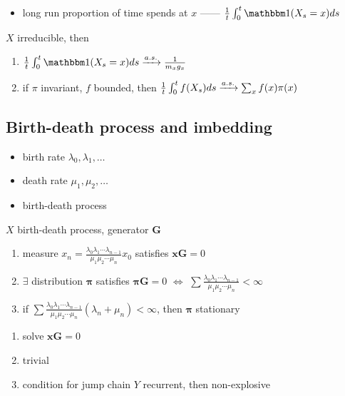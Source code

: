 \begin{itemize}
    \item long run proportion of time spends at $x$ ------ $\frac{1}{t} \int_0^t \In(X_s = x)ds$
\end{itemize}

\begin{thm}
    $X$ irreducible, then
    \begin{enumerate}
        \item $\frac{1}{t} \int_0^t \In(X_s = x)ds \rightarrowas \frac{1}{m_x g_x} $
        \item if $\pi$ invariant, $f$ bounded, then $\frac{1}{t} \int_0^t f(X_s)ds \xrightarrow{a.s.} \sum_x f(x)\pi(x)$
    \end{enumerate}
\end{thm}

\subsection{Birth-death process and imbedding}\label{subsec:birth-death-process-and-imbedding}

\begin{itemize}
    \item birth rate $\lambda_0, \lambda_1, \dots$
    \item death rate $\mu_{1}, \mu_2, \dots$
    \item birth-death process
\end{itemize}

\begin{thm}
    $X$ birth-death process, generator $\bm G$
    \begin{enumerate}
        \item measure $x_n = \frac{\lambda_0\lambda_1 \cdots \lambda_{n-1}}{\mu_1\mu_2\cdots\mu_n}x_0$ satisfies $\bm x \bm G = 0$
        \item $\exists$ distribution $\bm\pi$ satisfies $\bm \pi \bm G = 0$ $\iff$ $\sum \frac{\lambda_0\lambda_1 \cdots \lambda_{n-1}}{\mu_1\mu_2\cdots\mu_n}< \infty$
        \item if $\sum \frac{\lambda_0\lambda_1 \cdots \lambda_{n-1}}{\mu_1\mu_2\cdots\mu_n} (\lambda_n + \mu_n) < \infty$, then $\bm \pi$ stationary
    \end{enumerate}
\end{thm}
\begin{pf}
    \begin{enumerate}
        \item solve $\bm x \bm G =0$
        \item trivial
        \item condition for jump chain $Y$ recurrent, then non-explosive
    \end{enumerate}
\end{pf}

